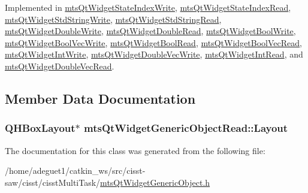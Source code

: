 Implemented in \hyperlink{classmts_qt_widget_state_index_write_a2c4ce9b09af6a20760a8ab643b5a77f8}{mts\-Qt\-Widget\-State\-Index\-Write}, \hyperlink{classmts_qt_widget_state_index_read_a55c12f3a2c8a6ab96d6763c3aca92aff}{mts\-Qt\-Widget\-State\-Index\-Read}, \hyperlink{classmts_qt_widget_std_string_write_a2bb0e3bd9ead0c8d1f45c4d850866c98}{mts\-Qt\-Widget\-Std\-String\-Write}, \hyperlink{classmts_qt_widget_std_string_read_a20892add108bb8f9a3623c9ba126e0dd}{mts\-Qt\-Widget\-Std\-String\-Read}, \hyperlink{classmts_qt_widget_double_write_a5f386ee1049f6153dcabc94c73f582f2}{mts\-Qt\-Widget\-Double\-Write}, \hyperlink{classmts_qt_widget_double_read_ac7feb0f4f219cad978349207ac6ce82a}{mts\-Qt\-Widget\-Double\-Read}, \hyperlink{classmts_qt_widget_bool_write_a5eb2213b3487392f77624abcd92872fc}{mts\-Qt\-Widget\-Bool\-Write}, \hyperlink{classmts_qt_widget_bool_vec_write_a330ae4e994be8862142e21d11310f1ca}{mts\-Qt\-Widget\-Bool\-Vec\-Write}, \hyperlink{classmts_qt_widget_bool_read_a916f37e2dff54320e2e5050f1b883c7b}{mts\-Qt\-Widget\-Bool\-Read}, \hyperlink{classmts_qt_widget_bool_vec_read_ab385467a11d1691bb1c09a17c2ff06f4}{mts\-Qt\-Widget\-Bool\-Vec\-Read}, \hyperlink{classmts_qt_widget_int_write_a757a7ade2b4bb02c0674cc9c99db907b}{mts\-Qt\-Widget\-Int\-Write}, \hyperlink{classmts_qt_widget_double_vec_write_acff9753bae2e9ad21c9fca44f26c0300}{mts\-Qt\-Widget\-Double\-Vec\-Write}, \hyperlink{classmts_qt_widget_int_read_a5c55cabb0365136fe77a339f20f2080b}{mts\-Qt\-Widget\-Int\-Read}, and \hyperlink{classmts_qt_widget_double_vec_read_a112d5ff2ff3b8d502470565da3df3d88}{mts\-Qt\-Widget\-Double\-Vec\-Read}.



\subsection{Member Data Documentation}
\hypertarget{classmts_qt_widget_generic_object_read_ad10c07d124b999b3f16522a6c6eb3789}{
\subsubsection[{Layout}]{\setlength{\rightskip}{0pt plus 5cm}Q\-H\-Box\-Layout$\ast$ mts\-Qt\-Widget\-Generic\-Object\-Read\-::\-Layout\hspace{0.3cm}{\ttfamily [protected]}}}\label{classmts_qt_widget_generic_object_read_ad10c07d124b999b3f16522a6c6eb3789}


The documentation for this class was generated from the following file\-:\begin{DoxyCompactItemize}
\item 
/home/adeguet1/catkin\-\_\-ws/src/cisst-\/saw/cisst/cisst\-Multi\-Task/\hyperlink{mts_qt_widget_generic_object_8h}{mts\-Qt\-Widget\-Generic\-Object.\-h}\end{DoxyCompactItemize}

